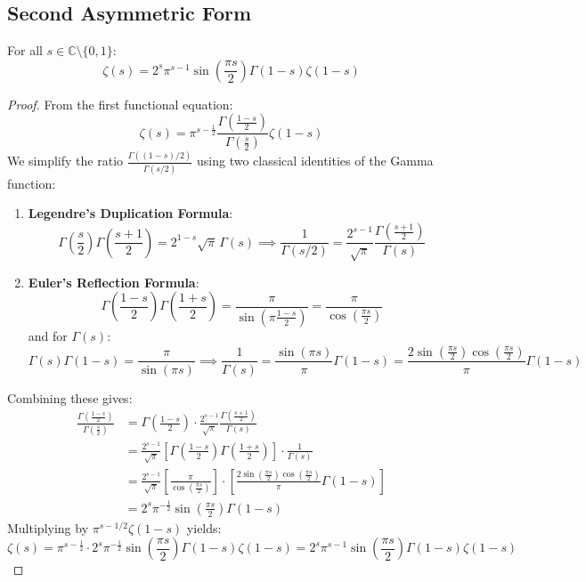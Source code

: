 \documentclass[a4paper]{article}
\begin{document}
\subsection{Second Asymmetric Form}\label{zf:subsec:second-asymmetric-form}

\begin{theorem}\label{zf:thm:reflection-functional-equation}
For all $s \in \mathbb{C} \setminus \{0, 1\}$:
\begin{equation} 
\boxed{
\zeta(s) = 2^s \pi^{s-1} \sin\left(\frac{\pi s}{2}\right) \Gamma (1-s) \zeta(1-s)
}
\end{equation}
\end{theorem}

\begin{proof}
From the first functional equation:
\[
    \zeta(s) = \pi^{s - \frac{1}{2}} \frac{\Gamma\left(\frac{1-s}{2}\right)}{\Gamma\left(\frac{s}{2}\right)} \zeta(1-s)
\]
We simplify the ratio $\frac{\Gamma((1-s)/2)}{\Gamma(s/2)}$ using two classical identities of the Gamma function:
\begin{enumerate}
    \item \textbf{Legendre's Duplication Formula}:
    \[
        \Gamma\left(\frac{s}{2}\right) \Gamma\left(\frac{s+1}{2}\right) = 2^{1-s} \sqrt{\pi} \, \Gamma(s) \implies \frac{1}{\Gamma(s/2)} = \frac{2^{s-1}}{\sqrt{\pi}} \frac{\Gamma\left(\frac{s+1}{2}\right)}{\Gamma(s)}
    \]
    \item \textbf{Euler's Reflection Formula}:
    \[
        \Gamma\left(\frac{1-s}{2}\right) \Gamma\left(\frac{1+s}{2}\right) = \frac{\pi}{\sin\left(\pi \frac{1-s}{2}\right)} = \frac{\pi}{\cos\left(\frac{\pi s}{2}\right)}
    \]
    and for $\Gamma(s)$:
    \[
        \Gamma(s) \Gamma(1-s) = \frac{\pi}{\sin(\pi s)} \implies \frac{1}{\Gamma(s)} = \frac{\sin(\pi s)}{\pi} \Gamma(1-s) = \frac{2 \sin\left(\frac{\pi s}{2}\right) \cos\left(\frac{\pi s}{2}\right)}{\pi} \Gamma(1-s)
    \]
\end{enumerate}
Combining these gives:
\begin{align*}
    \frac{\Gamma\left(\frac{1-s}{2}\right)}{\Gamma\left(\frac{s}{2}\right)} &= \Gamma\left(\frac{1-s}{2}\right) \cdot \frac{2^{s-1}}{\sqrt{\pi}} \frac{\Gamma\left(\frac{s+1}{2}\right)}{\Gamma(s)} \\
    &= \frac{2^{s-1}}{\sqrt{\pi}} \left[ \Gamma\left(\frac{1-s}{2}\right) \Gamma\left(\frac{1+s}{2}\right) \right] \cdot \frac{1}{\Gamma(s)} \\
    &= \frac{2^{s-1}}{\sqrt{\pi}} \left[ \frac{\pi}{\cos\left(\frac{\pi s}{2}\right)} \right] \cdot \left[ \frac{2 \sin\left(\frac{\pi s}{2}\right) \cos\left(\frac{\pi s}{2}\right)}{\pi} \Gamma(1-s) \right] \\
    &= 2^s \pi^{-\frac{1}{2}} \sin\left(\frac{\pi s}{2}\right) \Gamma(1-s)
\end{align*}
Multiplying by $\pi^{s - 1/2} \zeta(1-s)$ yields:
\[
    \zeta(s) = \pi^{s - \frac{1}{2}} \cdot 2^s \pi^{-\frac{1}{2}} \sin\left(\frac{\pi s}{2}\right) \Gamma(1-s) \zeta(1-s) = 2^s \pi^{s-1} \sin\left(\frac{\pi s}{2}\right) \Gamma(1-s) \zeta(1-s)
\]
\end{proof}
\end{document}
